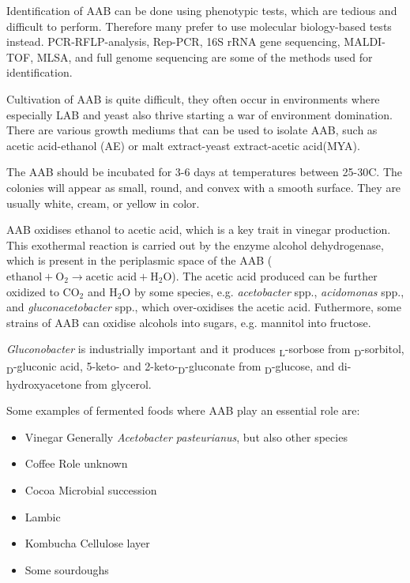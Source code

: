 Identification of AAB can be done using phenotypic tests, which are tedious and difficult to perform. Therefore many prefer to use molecular biology-based tests instead. PCR-RFLP-analysis, Rep-PCR, 16S rRNA gene sequencing, MALDI-TOF, MLSA, and full genome sequencing are some of the methods used for identification.

Cultivation of AAB is quite difficult, they often occur in environments where especially LAB and yeast also thrive starting a war of environment domination. There are various growth mediums that can be used to isolate AAB, such as  acetic acid-ethanol (AE) or malt extract-yeast extract-acetic acid(MYA).

The AAB should be incubated for 3-6 days at temperatures between 25-30\textdegree C. The colonies will appear as small, round, and convex with a smooth surface. They are usually white, cream, or yellow in color.

AAB oxidises ethanol to acetic acid, which is a key trait in vinegar production. This exothermal reaction is carried out by the enzyme alcohol dehydrogenase, which is present in the periplasmic space of the AAB ($\text{ethanol} + \text{O}_2 \rightarrow \text{acetic acid} + \text{H}_2\text{O}$). The acetic acid produced can be further oxidized to $\text{CO}_2$ and $\text{H}_2\text{O}$ by some species, e.g. \textit{acetobacter} spp., \textit{acidomonas} spp., and \textit{gluconacetobacter} spp., which over-oxidises the acetic acid.
Futhermore, some strains of AAB can oxidise alcohols into sugars, e.g. mannitol into fructose. 

\textit{Gluconobacter} is industrially important and it produces \textsubscript{L}-sorbose from \textsubscript{D}-sorbitol, \textsubscript{D}-gluconic acid, 5-keto- and 2-keto-\textsubscript{D}-gluconate from \textsubscript{D}-glucose, and di-hydroxyacetone from glycerol.

Some examples of fermented foods where AAB play an essential role are:
\begin{itemize}
    \item Vinegar
    \subitem Generally \textit{Acetobacter pasteurianus}, but also other species
    \item Coffee
    \subitem Role unknown
    \item Cocoa
    \subitem Microbial succession
    \item Lambic
    \item Kombucha
    \subitem Cellulose layer
    \item Some sourdoughs
\end{itemize}

